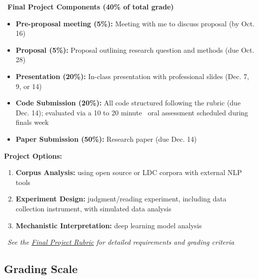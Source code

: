 \documentclass[11pt,letterpaper]{article}
\begin{document}
\begin{tcolorbox}[
    colback=urgold!10,
    colframe=urgold,
    boxrule=1pt,
    arc=2mm
]
\faGraduationCap\ \textbf{Final Project Components (40\% of total grade)}\\[-1em]
\begin{itemize}[leftmargin=*,itemsep=2pt]
    \item \textbf{Pre-proposal meeting (5\%):} Meeting with me to discuss proposal (by Oct. 16)
    \item \textbf{Proposal (5\%):} Proposal outlining research question and methods (due Oct. 28)
    \item \textbf{Presentation (20\%):} In-class presentation with professional slides (Dec. 7, 9, or 14)
    \item \textbf{Code Submission (20\%):} All code structured following the rubric (due Dec. 14); evaluated via a 10 to 20 minute \faComments\ oral assessment scheduled during finals week
    \item \textbf{Paper Submission (50\%):} Research paper (due Dec. 14)
\end{itemize}
\end{tcolorbox}
\begin{tcolorbox}[
    colback=urgold!10,
    colframe=urgold,
    boxrule=1pt,
    arc=2mm
]
\textbf{Project Options:}
\begin{enumerate}[leftmargin=*,itemsep=2pt]
    \item \textbf{Corpus Analysis:} using open source or LDC corpora with external NLP tools
    \item \textbf{Experiment Design:} judgment/reading experiment, including data collection instrument, with simulated data analysis
    \item \textbf{Mechanistic Interpretation:} deep learning model analysis
\end{enumerate}
\vspace{1em}
\faBook\ \textit{See the \href{https://aaronstevenwhite.io/stats-in-ling/final_project/rubric/final_project_rubric.pdf}{Final Project Rubric} for detailed requirements and grading criteria}
\end{tcolorbox}

\subsection{Grading Scale}
\end{document}
